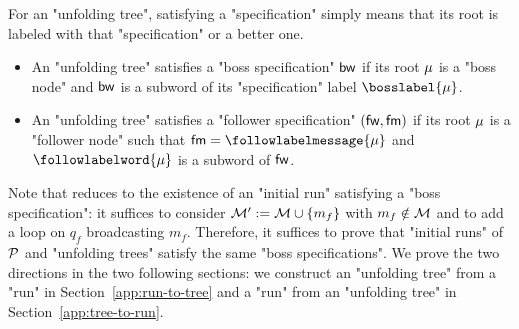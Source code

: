 For an "unfolding tree", satisfying a "specification" simply means that its root is labeled with that "specification" or a better one.

\begin{itemize}
	\item An "unfolding tree" satisfies a "boss specification" $\mathsf{bw}$ if its root $\mu$ is a "boss node" and $\mathsf{bw}$ is a subword of its "specification" label $\bosslabel{\node}$.
	
	\item An "unfolding tree" satisfies a "follower specification" $(\mathsf{fw}, \mathsf{fm})$ if its root $\mu$ is a "follower node" such that $\followmessagespec=\followlabelmessage{\node}$ and  $\followlabelword{\node}$ is a subword of $\mathsf{fw}$.
\end{itemize}

Note that \COVER reduces to the existence of an "initial run" satisfying a "boss specification": it suffices to consider $\mathcal{M}' := \mathcal{M} \cup \{m_f\}$ with $m_f \notin \mathcal{M}$ and to add a loop on $q_f$ broadcasting $m_f$. Therefore, it suffices to prove that "initial runs" of $\mathcal{P}$ and "unfolding trees" satisfy the same "boss specifications". We prove the two directions in the two following sections: we construct an "unfolding tree" from a "run" in  Section~\ref{app:run-to-tree} and a "run" from an "unfolding tree" in Section~\ref{app:tree-to-run}.





	

